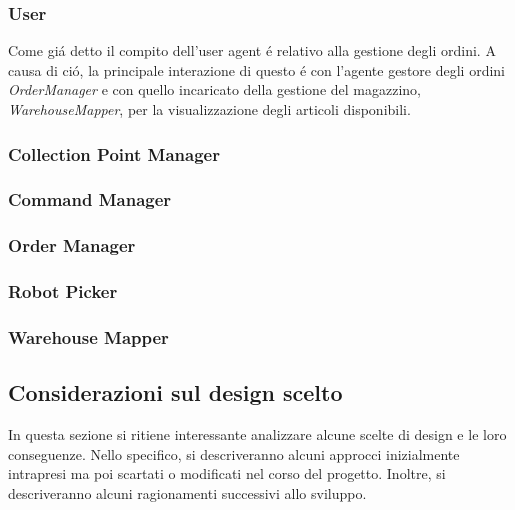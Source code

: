 \subsubsection{User}
Come gi\'a detto il compito dell'user agent \'e relativo alla gestione degli ordini. A causa di ci\'o, la principale interazione di questo \'e con l'agente gestore degli ordini \textit{OrderManager} e con quello incaricato della gestione del magazzino, \textit{WarehouseMapper}, per la visualizzazione degli articoli disponibili.

\subsubsection{Collection Point Manager}
\subsubsection{Command Manager}
\subsubsection{Order Manager}
\subsubsection{Robot Picker}
\subsubsection{Warehouse Mapper}

\subsection{Considerazioni sul design scelto}
In questa sezione si ritiene interessante analizzare alcune scelte di design e le loro conseguenze. Nello specifico, si descriveranno alcuni approcci inizialmente intrapresi ma poi scartati o modificati nel corso del progetto. Inoltre, si descriveranno alcuni ragionamenti successivi allo sviluppo.

